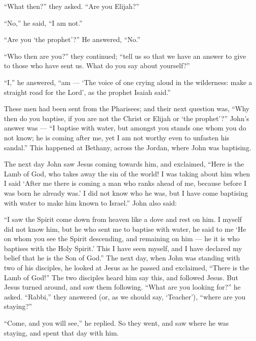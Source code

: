  ``What then?'' they asked. ``Are you Elijah?''

``No,'' he said, ``I am not.''

``Are you `the prophet'?'' He answered, ``No.''

 ``Who then are you?'' they continued; ``tell us so that we
have an answer to give to those who have sent us. What do you say about
yourself?''

 ``I,'' he answered, ``am --- `The voice of one crying
aloud in the wilderness: make a straight road for the Lord', as the
prophet Isaiah said.''

 These men had been sent from the Pharisees; 
and their next question was, ``Why then do you baptise, if you are not
the Christ or Elijah or `the prophet'?''  John's answer was
--- ``I baptise with water, but amongst you stands one whom you do not
know;  he is coming after me, yet I am not worthy even to
unfasten his sandal.''  This happened at Bethany, across
the Jordan, where John was baptising.

 The next day John saw Jesus coming towards him, and
exclaimed, ``Here is the Lamb of God, who takes away the sin of the
world!  I was taking about him when I said `After me there
is coming a man who ranks ahead of me, because before I was born he
already was.'  I did not know who he was, but I have come
baptising with water to make him known to Israel.''  John
also said:

``I saw the Spirit come down from heaven like a dove and rest on him.
 I myself did not know him, but he who sent me to baptise
with water, he said to me `He on whom you see the Spirit descending, and
remaining on him --- he it is who baptises with the Holy Spirit.'
 This I have seen myself, and I have declared my belief
that he is the Son of God.''  The next day, when John was
standing with two of his disciples,  he looked at Jesus as
he passed and exclaimed, ``There is the Lamb of God!''  The
two disciples heard him say this, and followed Jesus.  But
Jesus turned around, and saw them following. ``What are you looking
for?'' he asked. ``Rabbi,'' they answered (or, as we should say,
`Teacher'), ``where are you staying?''

 ``Come, and you will see,'' he replied. So they went, and
saw where he was staying, and spent that day with him.

